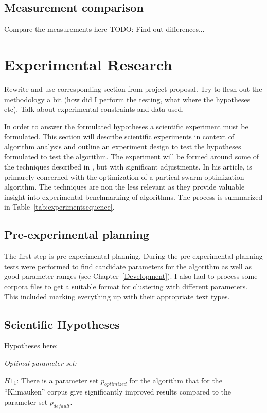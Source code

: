 \subsection{Measurement comparison}
Compare the measurements here
TODO: Find out differences...

\section{Experimental Research}
\label{ExperimentalResearch}
Rewrite and use corresponding section from project proposal. Try to flesh out the methodology a bit (how did I perform the testing, what where the hypotheses etc). Talk about experimental constraints and data used.

In order to answer the formulated hypotheses a scientific experiment must be formulated. This section will describe scientific experiments in context of algorithm analysis and outline an experiment design to test the hypotheses formulated to test the \CTC algorithm. The experiment will be formed around some of the techniques described in \cite{Bartz-Beielstein2004}, but with significant adjustments. In his article, \citeauthor{Bartz-Beielstein2004} is primarely concerned with the optimization of a partical swarm optimization algorithm. The techniques are non the less relevant as they provide valuable insight into experimental benchmarking of algorithms. The process is summarized in Table~\ref{tab:experimentsequence}.

\subsection{Pre-experimental planning}
The first step is pre-experimental planning. During the pre-experimental planning tests were performed to find candidate parameters for the algorithm as well as good parameter ranges (see Chapter~\ref{Development}). I also had to process some corpora files to get a suitable format for clustering with different parameters. This included marking everything up with their appropriate text types.

\subsection{Scientific Hypotheses}
Hypotheses here:

\emph{Optimal parameter set:}

\(H1_{1}\): There is a parameter set \(p_{optimized}\) for the \CTC algorithm that for the ``Klimauken'' corpus give significantly improved results compared to the parameter set \(p_{default}\).

